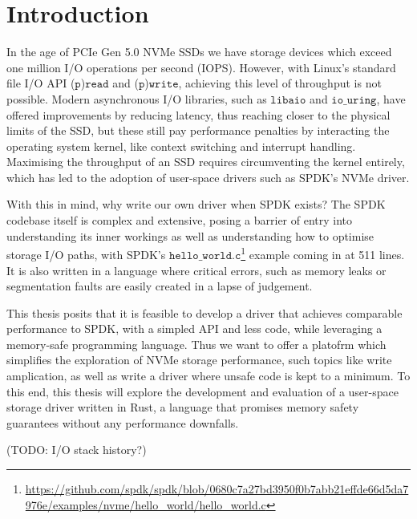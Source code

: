 \chapter{Introduction}\label{chapter:introduction}
In the age of PCIe Gen 5.0 NVMe SSDs we have storage devices which exceed one million I/O operations per second (IOPS). However, with Linux's standard file I/O API ($\texttt{p}$)$\texttt{read}$ and ($\texttt{p}$)$\texttt{write}$, achieving this level of throughput is not possible. Modern asynchronous I/O libraries, such as $\texttt{libaio}$ and $\texttt{io\_uring}$, have offered improvements by reducing latency, thus reaching closer to the physical limits of the SSD, but these still pay performance penalties by interacting the operating system kernel, like context switching and interrupt handling\cite{storage_api}. Maximising the throughput of an SSD requires circumventing the kernel entirely, which has led to the adoption of user-space drivers such as SPDK's NVMe driver.

With this in mind, why write our own driver when SPDK exists? The SPDK codebase itself is complex and extensive, posing a barrier of entry into understanding its inner workings as well as understanding how to optimise storage I/O paths, with SPDK's $\texttt{hello\_world.c}$\footnote{\url{https://github.com/spdk/spdk/blob/0680c7a27bd3950f0b7abb21effde66d5da7976e/examples/nvme/hello_world/hello_world.c}} example coming in at 511 lines. It is also written in a language where critical errors, such as memory leaks or segmentation faults are easily created in a lapse of judgement.

This thesis posits that it is feasible to develop a driver that achieves comparable performance to SPDK, with a simpled API and less code, while leveraging a memory-safe programming language. Thus we want to offer a platofrm which simplifies the exploration of NVMe storage performance, such topics like write amplication, as well as write a driver where unsafe code is kept to a minimum. To this end, this thesis will explore the development and evaluation of a user-space storage driver written in Rust, a language that promises memory safety guarantees without any performance downfalls.

(TODO: I/O stack history?)
